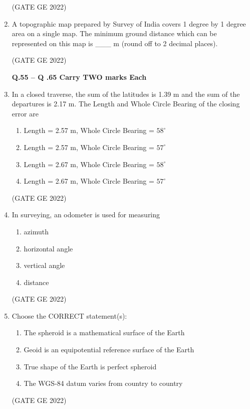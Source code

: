 \documentclass[journal,12pt,onecolumn]{IEEEtran}
\theoremstyle{remark}
\begin{document}
\begin{enumerate}
\hfill (GATE GE 2022)

\item A topographic map prepared by Survey of India covers 1 degree by 1 degree area on a single map. The minimum ground distance which can be represented on this map is \_\_\_ m (round off to 2 decimal places).

\hfill (GATE GE 2022)

\textbf{Q.55 – Q .65 Carry TWO marks Each}

\item In a closed traverse, the sum of the latitudes is 1.39 m and the sum of the departures is 2.17 m. The Length and Whole Circle Bearing of the closing error are
\begin{enumerate}
    \item Length = 2.57 m, Whole Circle Bearing = $58^\circ$
    \item Length = 2.57 m, Whole Circle Bearing = $57^\circ$
    \item Length = 2.67 m, Whole Circle Bearing = $58^\circ$
    \item Length = 2.67 m, Whole Circle Bearing = $57^\circ$
\end{enumerate}

\hfill (GATE GE 2022)

\item In surveying, an odometer is used for measuring
\begin{enumerate}
    \item azimuth
    \item horizontal angle
    \item vertical angle
    \item distance
\end{enumerate}

\hfill (GATE GE 2022)

\item Choose the CORRECT statement(s):
\begin{enumerate}
    \item The spheroid is a mathematical surface of the Earth
    \item Geoid is an equipotential reference surface of the Earth
    \item True shape of the Earth is perfect spheroid
    \item The WGS-84 datum varies from country to country
\end{enumerate}

\hfill (GATE GE 2022)


\end{enumerate}
\end{document}
